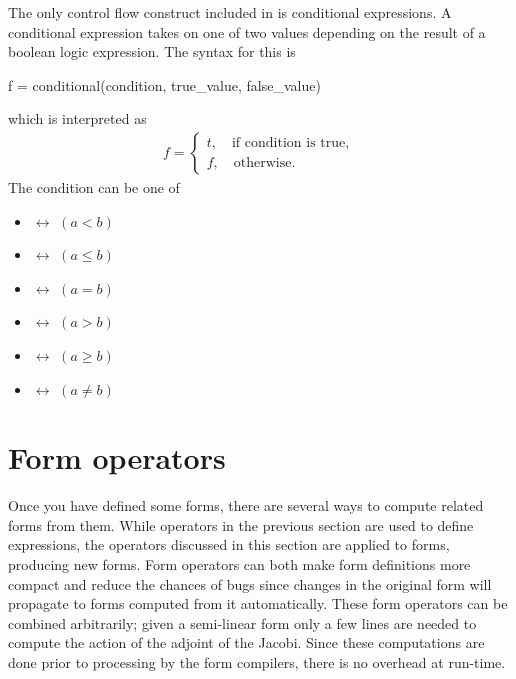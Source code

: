 The only control flow construct included in \ufl{} is
conditional expressions. A conditional expression
takes on one of two values depending on the result
of a boolean logic expression. The syntax for this is
\begin{python}
f = conditional(condition, true_value, false_value)
\end{python}
which is interpreted as
\begin{align}
f = \begin{cases}
    t, \quad \mbox{if condition is true}, \\
    f, \quad \mbox{otherwise}.
    \end{cases}
\end{align}
The condition can be one of
\begin{multicols}{2}
\begin{itemize}
\item {} $\leftrightarrow$ $(a < b)$
\item {} $\leftrightarrow$ $(a \le b)$
\item {} $\leftrightarrow$ $(a = b)$
\end{itemize}
\begin{itemize}
\item {} $\leftrightarrow$ $(a > b)$
\item {} $\leftrightarrow$ $(a \ge b)$
\item {} $\leftrightarrow$ $(a \ne b)$
\end{itemize}
\end{multicols}

\section{Form operators} \label{ufl:sec:formtransformations}

Once you have defined some forms, there are several ways to compute
related forms from them.  While operators in the previous section are
used to define expressions, the operators discussed in this section
are applied to forms, producing new forms.  Form operators can both
make form definitions more compact and reduce the chances of bugs
since changes in the original form will propagate to forms computed
from it automatically.  These form operators can be combined
arbitrarily; given a semi-linear form only a few lines are needed to
compute the action of the adjoint of the Jacobi.  Since these
computations are done prior to processing by the form compilers, there
is no overhead at run-time.

